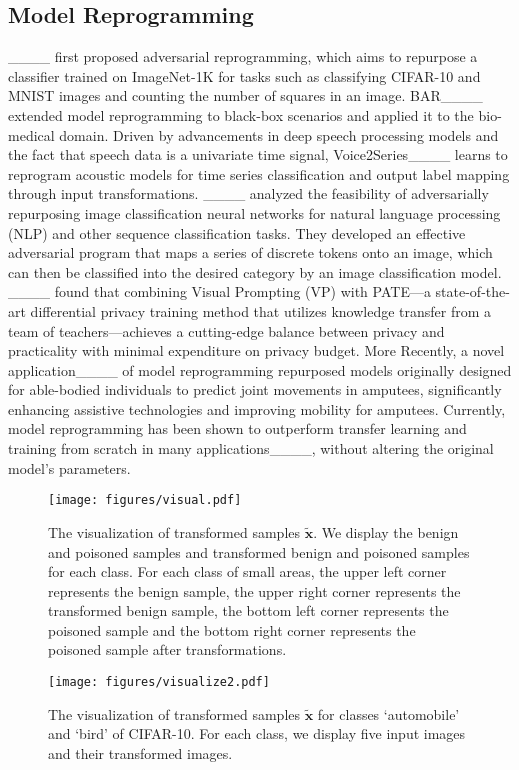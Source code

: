 \subsection{Model Reprogramming}

____ first proposed adversarial reprogramming, which aims to repurpose a classifier trained on ImageNet-1K for tasks such as classifying CIFAR-10 and MNIST images and counting the number of squares in an image. BAR____ extended model reprogramming to black-box scenarios and applied it to the bio-medical domain. Driven by advancements in deep speech processing models and the fact that speech data is a univariate time signal, Voice2Series____ learns to reprogram acoustic models for time series classification and output label mapping through input transformations. ____ analyzed the feasibility of adversarially repurposing image classification neural networks for natural language processing (NLP) and other sequence classification tasks. They developed an effective adversarial program that maps a series of discrete tokens onto an image, which can then be classified into the desired category by an image classification model. ____ found that combining Visual Prompting (VP) with PATE—a state-of-the-art differential privacy training method that utilizes knowledge transfer from a team of teachers—achieves a cutting-edge balance between privacy and practicality with minimal expenditure on privacy budget. More Recently, a novel application____ of model reprogramming repurposed models originally designed for able-bodied individuals to predict joint movements in amputees, significantly enhancing assistive technologies and improving mobility for amputees. Currently, model reprogramming has been shown to outperform transfer learning and training from scratch in many applications____, without altering the original model's parameters.


\begin{figure}[!t]
    \vspace{-2em}
    \centering
    \texttt{[image: figures/visual.pdf]}
    \caption{The visualization of transformed samples $\tilde{\bm{x}}$. We display the benign and poisoned samples and transformed benign and poisoned samples for each class. For each class of small areas, the upper left corner represents the benign sample, the upper right corner represents the transformed benign sample, the bottom left corner represents the poisoned sample and the bottom right corner represents the poisoned sample after transformations.}
    \label{fig:visual}
\end{figure}

\begin{figure}[!t]
    \centering
    \texttt{[image: figures/visualize2.pdf]}
    \caption{The visualization of transformed samples $\tilde{\bm{x}}$ for classes `automobile' and `bird' of CIFAR-10. For each class, we display five input images and their transformed images.}
    \label{fig:visualize2}
    \vspace{-1em}
\end{figure}